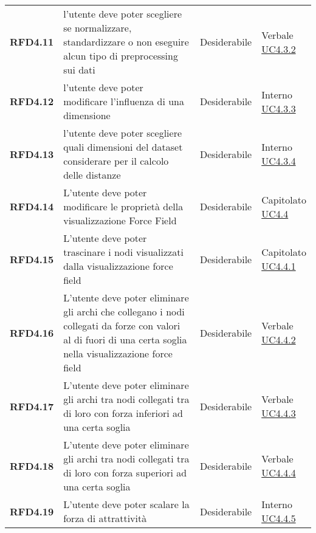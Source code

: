 \begin{longtable}[H]{>{\raggedright\bfseries}m{20mm} >{\raggedright}m{90mm} >{\raggedright}m{28mm} >{\raggedright\arraybackslash}m{30mm}}
    RFD4.11
    & l'utente deve poter scegliere se normalizzare, standardizzare o non eseguire alcun tipo di preprocessing sui dati
    & Desiderabile
    & \makecell{ Verbale \\ \hyperref[par:uc4.3.2]{UC4.3.2} }\\

    RFD4.12
    & l'utente deve poter modificare l'influenza di una dimensione
    & Desiderabile
    & \makecell{ Interno \\ \hyperref[par:uc4.3.3]{UC4.3.3} }\\

    RFD4.13
    & l'utente deve poter scegliere quali dimensioni del dataset considerare per il calcolo delle distanze
    & Desiderabile
    & \makecell{ Interno \\ \hyperref[par:uc4.3.2]{UC4.3.4} }\\

    RFD4.14
    & L'utente deve poter modificare le proprietà della visualizzazione Force Field
    & Desiderabile
    & \makecell{ Capitolato \\ \hyperref[ssub:uc4.4]{UC4.4} }\\

    RFD4.15
    & L'utente deve poter trascinare i nodi visualizzati dalla visualizzazione force field
    & Desiderabile
    & \makecell{ Capitolato \\ \hyperref[par:uc4.4.1]{UC4.4.1} }\\

    RFD4.16
    & L'utente deve poter eliminare gli archi che collegano i nodi collegati da forze con valori al di fuori di una certa soglia nella visualizzazione force field
    & Desiderabile
    & \makecell{ Verbale \\ \hyperref[par:uc4.4.2]{UC4.4.2} }\\

    RFD4.17
    & L'utente deve poter eliminare gli archi tra nodi collegati tra di loro con forza inferiori ad una certa soglia
    & Desiderabile
    & \makecell{ Verbale \\ \hyperref[par:uc4.4.3]{UC4.4.3} }\\

    RFD4.18
    & L'utente deve poter eliminare gli archi tra nodi collegati tra di loro con forza superiori ad una certa soglia
    & Desiderabile
    & \makecell{ Verbale \\ \hyperref[par:uc4.4.4]{UC4.4.4} }\\

    RFD4.19
    & L'utente deve poter scalare la forza di attrattività
    & Desiderabile
    & \makecell{ Interno \\ \hyperref[par:uc4.4.5]{UC4.4.5} }\\


\end{longtable}
